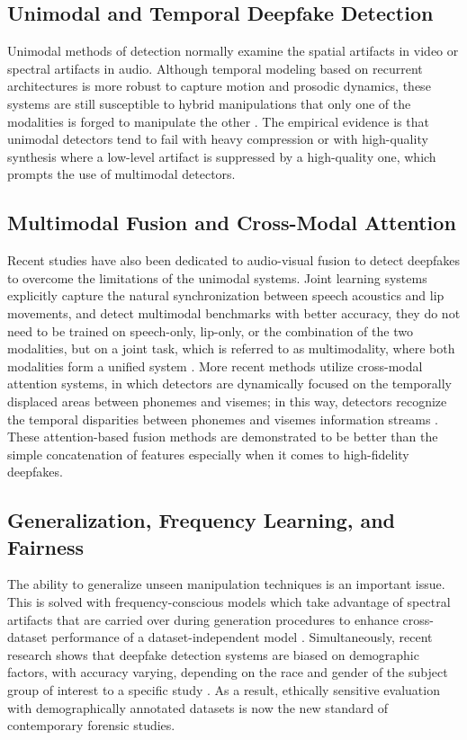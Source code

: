 \documentclass[conference]{IEEEtran}
\begin{document}
\subsection{Unimodal and Temporal Deepfake Detection}
Unimodal methods of detection normally examine the spatial artifacts in video or spectral artifacts in audio. Although temporal modeling based on recurrent architectures is more robust to capture motion and prosodic dynamics, these systems are still susceptible to hybrid manipulations that only one of the modalities is forged to manipulate the other \cite{Sabir2022,Dolhansky2022Generalization}. The empirical evidence is that unimodal detectors tend to fail with heavy compression or with high-quality synthesis where a low-level artifact is suppressed by a high-quality one, which prompts the use of multimodal detectors.

\subsection{Multimodal Fusion and Cross-Modal Attention}
Recent studies have also been dedicated to audio-visual fusion to detect deepfakes to overcome the limitations of the unimodal systems. Joint learning systems explicitly capture the natural synchronization between speech acoustics and lip movements, and detect multimodal benchmarks with better accuracy, they do not need to be trained on speech-only, lip-only, or the combination of the two modalities, but on a joint task, which is referred to as multimodality, where both modalities form a unified system \cite{Yang2023}. More recent methods utilize cross-modal attention systems, in which detectors are dynamically focused on the temporally displaced areas between phonemes and visemes; in this way, detectors recognize the temporal disparities between phonemes and visemes information streams \cite{Li2022Attention,Katamneni2024}. These attention-based fusion methods are demonstrated to be better than the simple concatenation of features especially when it comes to high-fidelity deepfakes.

\subsection{Generalization, Frequency Learning, and Fairness}
The ability to generalize unseen manipulation techniques is an important issue. This is solved with frequency-conscious models which take advantage of spectral artifacts that are carried over during generation procedures to enhance cross-dataset performance of a dataset-independent model  \cite{Kim2024Freq}. Simultaneously, recent research shows that deepfake detection systems are biased on demographic factors, with accuracy varying, depending on the race and gender of the subject group of interest to a specific study \cite{Terhorst2022Bias,Ju2024Fairness}. As a result, ethically sensitive evaluation with demographically annotated datasets is now the new standard of contemporary forensic studies.
\end{document}
